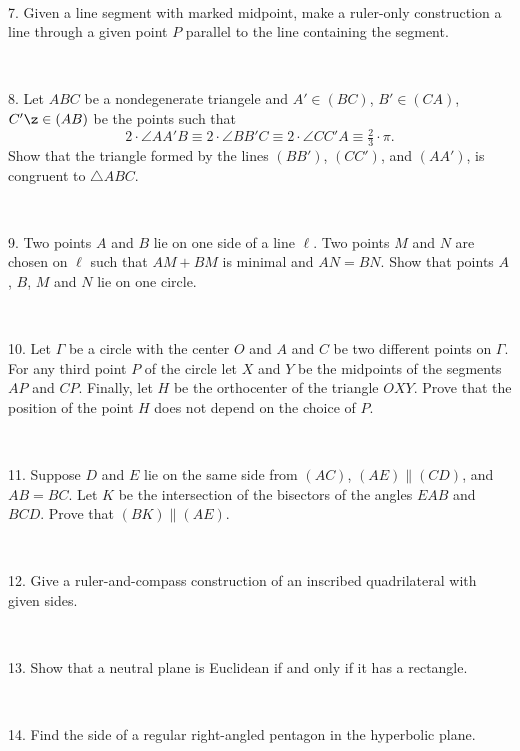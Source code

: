 \documentclass[oneside,a4paper]{article}
\begin{document}
\ 

\noi %
{7.} %
Given a line segment with marked midpoint, make a ruler-only construction a line through a given point $P$ parallel to the line containing the segment.


\ 

\noi %
{8.} Let $ABC$ be a nondegenerate triangele and $A'\in (BC)$, $B'\in (CA)$, $C'\z\in (AB)$ be the points such that 
\[2\cdot \angle AA'B\equiv 2\cdot \angle BB'C\equiv 2\cdot \angle CC'A\equiv \tfrac23{\cdot}\pi.\]
Show that the triangle formed by the lines $(BB')$, $(CC')$, and $(AA')$, is congruent to  $\triangle ABC$.



\ 

\noi %
{9.} Two points $A$ and $B$ lie on one side of a line $\ell$. 
Two points $M$ and $N$ are chosen on $\ell$ such that $AM + BM$ is minimal and $AN = BN$. 
Show that points $A$, $B$, $M$ and $N$ lie on one circle.


\ 

\noi %
{10.}
Let $\Gamma$ be a circle with the center $O$ and $A$ and $C$ be two different points on $\Gamma$. For any third point $P$ of the circle let $X$ and $Y$ be the midpoints of the segments $AP$ and $CP$. Finally, let $H$ be the orthocenter of the triangle $OXY$. Prove that the position of the point $H$ does not depend on the choice of $P$.

\ 

\noi %
{11.}
Suppose $D$ and $E$ lie on the same side from $(AC)$, $(AE)\parallel (CD)$, and $AB=BC$.
Let $K$ be the intersection of the bisectors of the angles $EAB$ and $BCD$.
Prove that $(BK) \parallel (AE)$.




\ 

\noi %
{12.} Give a ruler-and-compass construction of an inscribed quadrilateral with given sides.

\ 

\noi %
{13.} %
Show that a neutral plane is Euclidean if and only if it has a rectangle.

\ 

\noi %
{14.} Find the side of a regular right-angled pentagon in the hyperbolic plane.
\end{document}
